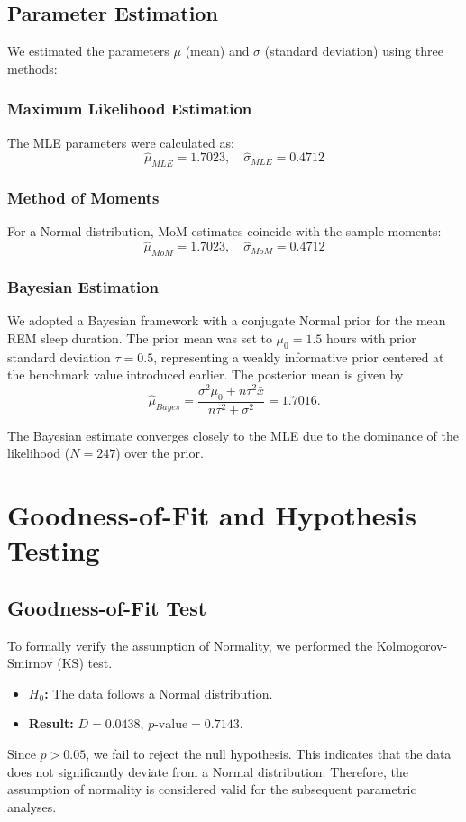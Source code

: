 \documentclass[conference]{IEEEtran}
\begin{document}
\subsection{Parameter Estimation}
We estimated the parameters $\mu$ (mean) and $\sigma$ (standard deviation) using three methods:

\subsubsection{Maximum Likelihood Estimation}
The MLE parameters were calculated as:
\[ \hat{\mu}_{MLE} = 1.7023, \quad \hat{\sigma}_{MLE} = 0.4712 \]

\subsubsection{Method of Moments}
For a Normal distribution, MoM estimates coincide with the sample moments:
\[ \hat{\mu}_{MoM} = 1.7023, \quad \hat{\sigma}_{MoM} = 0.4712 \]

\subsubsection{Bayesian Estimation}
We adopted a Bayesian framework with a conjugate Normal prior for the mean REM sleep duration. 
The prior mean was set to $\mu_0 = 1.5$ hours with prior standard deviation $\tau = 0.5$, representing a weakly informative prior centered at the benchmark value introduced earlier.
The posterior mean is given by
\begin{equation}
    \hat{\mu}_{Bayes} = \frac{\sigma^2 \mu_0 + n \tau^2 \bar{x}}{n \tau^2 + \sigma^2} = 1.7016.
\end{equation}

The Bayesian estimate converges closely to the MLE due to the dominance of the likelihood ($N=247$) over the prior.

\section{Goodness-of-Fit and Hypothesis Testing}

\subsection{Goodness-of-Fit Test}
To formally verify the assumption of Normality, we performed the Kolmogorov-Smirnov (KS) test.
\begin{itemize}
    \item \textbf{$H_0$:} The data follows a Normal distribution.
    \item \textbf{Result:} $D = 0.0438$, $p\text{-value} = 0.7143$.
\end{itemize}
Since $p > 0.05$, we fail to reject the null hypothesis. This indicates that the data does not significantly deviate from a Normal distribution. Therefore, the assumption of normality is considered valid for the subsequent parametric analyses.
\end{document}
